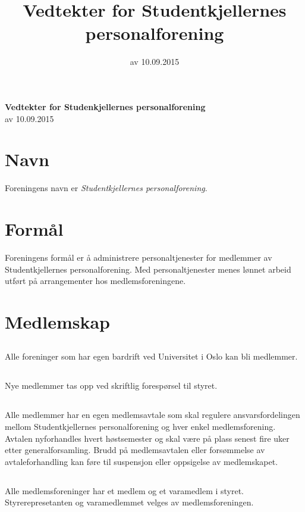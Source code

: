 \documentclass[11pt]{article}
\begin{document}
\pagestyle{fancy}
\fancyhf{}
\title{Vedtekter for Studentkjellernes personalforening}
\date{av 10.09.2015}

\begin{center}
    {\LARGE\textbf{Vedtekter for Studenkjellernes personalforening}}\\[7pt]
    av 10.09.2015	
\end{center}


\section{Navn}
\label{sec:1}
Foreningens navn er \emph{Studentkjellernes personalforening}.
\section{Formål}
\label{sec:2}
Foreningens formål er å administrere personaltjenester for medlemmer av 
Studentkjellernes personalforening.
Med personaltjenester menes lønnet arbeid utført på arrangementer hos medlemsforeningene.
\section{Medlemskap}
\label{sec:3}
\subsection{}
\label{sub:3.1}
Alle foreninger som har egen bardrift ved Universitet i Oslo kan bli medlemmer.
\subsection{}
\label{sub:3.2}
Nye medlemmer tas opp ved skriftlig forespørsel til styret.
\subsection{}
\label{sub:3.3}
Alle medlemmer har en egen medlemsavtale som skal regulere ansvarsfordelingen
mellom Studentkjellernes personalforening og hver enkel medlemsforening.
Avtalen nyforhandles hvert høstsemester og skal være på plass senest
fire uker etter generalforsamling. 
Brudd på medlemsavtalen eller forsømmelse av avtaleforhandling
kan føre til suspensjon eller oppsigelse av medlemskapet.
\subsection{}
\label{sub:3.4}
Alle medlemsforeninger har et medlem og et varamedlem i styret.
Styrerepresetanten og varamedlemmet velges av medlemsforeningen.
\end{document}
